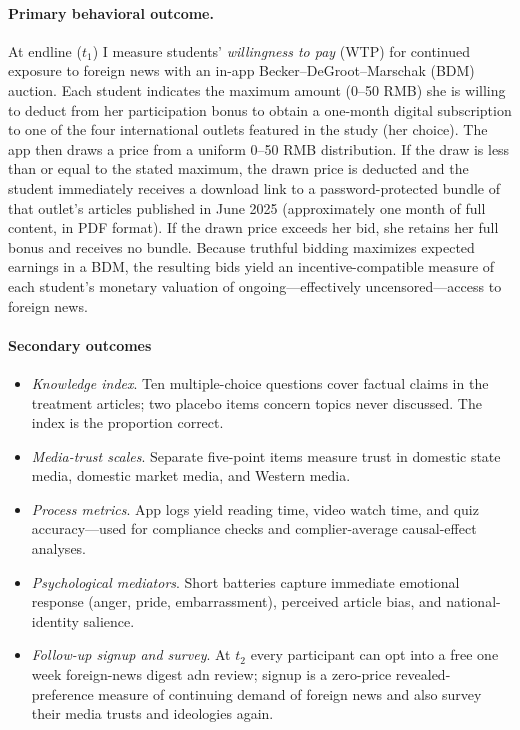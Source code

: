 \documentclass[12pt, american]{article}
\begin{document}
\paragraph{Primary behavioral outcome.}  
At endline ($t_{1}$) I measure students’ \textit{willingness to pay} (WTP) for continued exposure to foreign news with an in-app Becker–DeGroot–Marschak (BDM) auction.  Each student indicates the maximum amount (0–50 RMB) she is willing to deduct from her participation bonus to obtain a one-month digital subscription to one of the four international outlets featured in the study (her choice).  The app then draws a price from a uniform 0–50 RMB distribution.  If the draw is less than or equal to the stated maximum, the drawn price is deducted and the student immediately receives a download link to a password-protected bundle of that outlet’s articles published in June 2025 (approximately one month of full content, in PDF format).  If the drawn price exceeds her bid, she retains her full bonus and receives no bundle.  Because truthful bidding maximizes expected earnings in a BDM, the resulting bids yield an incentive-compatible measure of each student’s monetary valuation of ongoing—effectively uncensored—access to foreign news.

\paragraph{Secondary outcomes}

\begin{itemize}
    \item \textit{Knowledge index}.  Ten multiple-choice questions cover factual claims in the treatment articles; two placebo items concern topics never discussed.  The index is the proportion correct.
    \item \textit{Media-trust scales}.  Separate five-point items measure trust in domestic state media, domestic market media, and Western media.
    \item \textit{Process metrics}.  App logs yield reading time, video watch time, and quiz accuracy—used for compliance checks and complier-average causal-effect analyses.
    \item \textit{Psychological mediators}.  Short batteries capture immediate emotional response (anger, pride, embarrassment), perceived article bias, and national-identity salience.
    \item \textit{Follow-up signup and survey}.  At $t_{2}$ every participant can opt into a free one week foreign-news digest adn review; signup is a zero-price revealed-preference measure of continuing demand of foreign news and also survey their media trusts and ideologies again.
\end{itemize}
\end{document}
